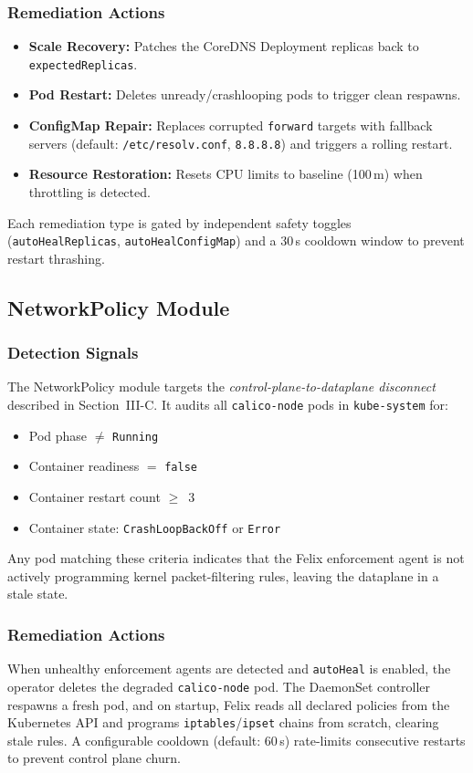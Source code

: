 \documentclass[conference]{IEEEtran}
\begin{document}
\subsubsection{Remediation Actions}
\begin{itemize}
  \item \textbf{Scale Recovery:} Patches the CoreDNS Deployment replicas back to \texttt{expectedReplicas}.
  \item \textbf{Pod Restart:} Deletes unready/crashlooping pods to trigger clean respawns.
  \item \textbf{ConfigMap Repair:} Replaces corrupted \texttt{forward} targets with fallback servers (default: \texttt{/etc/resolv.conf}, \texttt{8.8.8.8}) and triggers a rolling restart.
  \item \textbf{Resource Restoration:} Resets CPU limits to baseline (100\,m) when throttling is detected.
\end{itemize}

Each remediation type is gated by independent safety toggles (\texttt{autoHealReplicas}, \texttt{autoHealConfigMap}) and a 30\,s cooldown window to prevent restart thrashing.

\subsection{NetworkPolicy Module}

\subsubsection{Detection Signals}
The NetworkPolicy module targets the \emph{control-plane-to-dataplane disconnect} described in Section~III-C. It audits all \texttt{calico-node} pods in \texttt{kube-system} for:
\begin{itemize}
  \item Pod phase $\neq$ \texttt{Running}
  \item Container readiness $=$ \texttt{false}
  \item Container restart count $\geq$~3
  \item Container state: \texttt{CrashLoopBackOff} or \texttt{Error}
\end{itemize}

Any pod matching these criteria indicates that the Felix enforcement agent is not actively programming kernel packet-filtering rules, leaving the dataplane in a stale state.

\subsubsection{Remediation Actions}
When unhealthy enforcement agents are detected and \texttt{autoHeal} is enabled, the operator deletes the degraded \texttt{calico-node} pod. The DaemonSet controller respawns a fresh pod, and on startup, Felix reads all declared policies from the Kubernetes API and programs \texttt{iptables}/\texttt{ipset} chains from scratch, clearing stale rules. A configurable cooldown (default: 60\,s) rate-limits consecutive restarts to prevent control plane churn.
\end{document}
